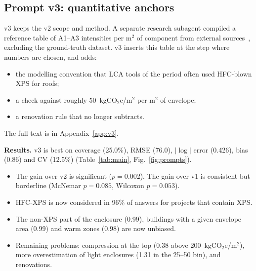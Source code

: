 \documentclass[10pt,letterpaper]{article}
\newcommand{\coe}{kgCO$_2$e/m$^2$}
\begin{document}
\subsection{Prompt v3: quantitative anchors}
v3 keeps the v2 scope and method. A separate research subagent compiled a reference table of A1--A3 intensities per m$^2$ of component from external sources~\cite{clf2025,pci,kawneer,rdh}, excluding the ground-truth dataset. v3 inserts this table at the step where numbers are chosen, and adds:
\begin{itemize}
\item the modelling convention that LCA tools of the period often used HFC-blown XPS for roofs;
\item a check against roughly 50~\coe{} per m$^2$ of envelope;
\item a renovation rule that no longer subtracts.
\end{itemize}
The full text is in Appendix~\ref{app:v3}.

\textbf{Results.} v3 is best on coverage (25.0\%), RMSE (76.0), $|\log|$ error (0.426), bias (0.86) and CV (12.5\%) (Table~\ref{tab:main}, Fig.~\ref{fig:prompts}).
\begin{itemize}
\item The gain over v2 is significant ($p=0.002$). The gain over v1 is consistent but borderline (McNemar $p=0.085$, Wilcoxon $p=0.053$).
\item HFC-XPS is now considered in 96\% of answers for projects that contain XPS.
\item The non-XPS part of the enclosure (0.99), buildings with a given envelope area (0.99) and warm zones (0.98) are now unbiased.
\item Remaining problems: compression at the top (0.38 above 200~\coe{}), more overestimation of light enclosures (1.31 in the 25--50 bin), and renovations.
\end{itemize}
\end{document}
